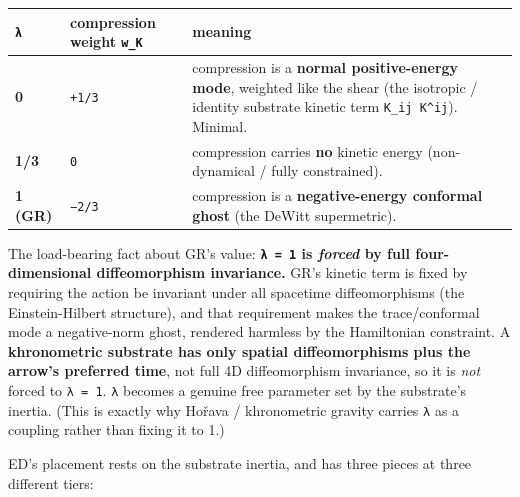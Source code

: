 \documentclass[
]{article}
\newcounter{none} %
\begin{document}
{\def\LTcaptype{none} %
\begin{longtable}[]{@{}
  >{\raggedright\arraybackslash}p{}
  >{\raggedright\arraybackslash}p{}
  >{\raggedright\arraybackslash}p{}@{}}
\toprule\noalign{}
\begin{minipage}[b]{\linewidth}\raggedright
\texttt{λ}
\end{minipage} & \begin{minipage}[b]{\linewidth}\raggedright
compression weight \texttt{w\_K}
\end{minipage} & \begin{minipage}[b]{\linewidth}\raggedright
meaning
\end{minipage} \\
\midrule\noalign{}
\endhead
\bottomrule\noalign{}
\endlastfoot
\textbf{0} & \texttt{+1/3} & compression is a \textbf{normal
positive-energy mode}, weighted like the shear (the isotropic / identity
substrate kinetic term \texttt{K\_ij\ K\^{}ij}). Minimal. \\
\textbf{1/3} & \texttt{0} & compression carries \textbf{no} kinetic
energy (non-dynamical / fully constrained). \\
\textbf{1 (GR)} & \texttt{−2/3} & compression is a
\textbf{negative-energy conformal ghost} (the DeWitt supermetric). \\
\end{longtable}
}

The load-bearing fact about GR's value: \textbf{\texttt{λ\ =\ 1} is
\emph{forced} by full four-dimensional diffeomorphism invariance.} GR's
kinetic term is fixed by requiring the action be invariant under all
spacetime diffeomorphisms (the Einstein-Hilbert structure), and that
requirement makes the trace/conformal mode a negative-norm ghost,
rendered harmless by the Hamiltonian constraint. A \textbf{khronometric
substrate has only spatial diffeomorphisms plus the arrow's preferred
time}, not full 4D diffeomorphism invariance, so it is \emph{not} forced
to \texttt{λ\ =\ 1}. \texttt{λ} becomes a genuine free parameter set by
the substrate's inertia. (This is exactly why Hořava / khronometric
gravity carries \texttt{λ} as a coupling rather than fixing it to 1.)

ED's placement rests on the substrate inertia, and has three pieces at
three different tiers:
\end{document}
